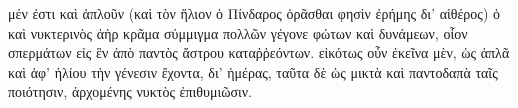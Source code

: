 \documentclass[a4paper, 11pt, oneside, polutonikogreek, german]{article}
\begin{document}
μέν ἐστι καὶ ἁπλοῦν (καὶ τὸν ἥλιον ὁ Πίνδαρος ὁρᾶσθαι φησὶν ἐρήμης δι' αἰθέρος) ὁ καὶ νυκτερινὸς ἀὴρ κρᾶμα σύμμιγμα πολλῶν γέγονε φώτων καὶ δυνάμεων, οἷον σπερμάτων εἰς ἓν ἀπὸ παντὸς ἄστρου καταῤῥεόντων. εἰκότως οὖν ἐκεῖνα μὲν, ὡς ἁπλᾶ καὶ ἀφ' ἡλίου τὴν γένεσιν ἔχοντα, δι' ἡμέρας, ταῦτα δὲ ὡς μικτὰ καὶ παντοδαπὰ ταῖς ποιότησιν, ἀρχομένης νυκτὸς ἐπιθυμιῶσιν.

\clearpage
\end{document}
